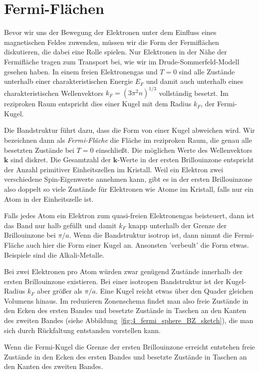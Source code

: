 \section{Fermi-Flächen}

Bevor wir uns der Bewegung der Elektronen unter dem Einfluss eines magnetischen Feldes zuwenden, müssen wir die Form der Fermiflächen diskutieren, die dabei eine Rolle spielen. Nur Elektronen in der Nähe der Fermifläche tragen zum Transport bei, wie wir im Drude-Sommerfeld-Modell gesehen haben.  In einem freien Elektronengas und $T=0$ sind alle Zustände unterhalb einer charakteristischen Energie $E_F$ und damit auch unterhalb eines charakteristischen Wellenvektors $k_F = (3 \pi^2 n)^{1/3}$ vollständig besetzt. Im reziproken Raum entspricht dies einer Kugel mit dem Radius $k_F$, der Fermi-Kugel.

Die Bandstruktur führt dazu, dass die Form von einer Kugel abweichen wird. Wir bezeichnen dann als \emph{Fermi-Fläche} die Fläche im reziproken Raum, die genau alle besetzten Zustände bei $T=0$ einschließt. Die möglichen Werte des Wellenvektors $\mathbf{k}$ sind diskret. Die Gesamtzahl der  $\mathbf{k}$-Werte in der ersten Brillouinzone entspricht der Anzahl primitiver Einheitszellen im Kristall. Weil ein Elektron zwei verschiedene Spin-Eigenwerte annehmen kann, gibt es in der ersten Brillouinzone also doppelt so viele Zustände für Elektronen wie Atome im Kristall, falls nur ein Atom in der Einheitszelle ist.

Falls jedes Atom ein Elektron zum quasi-freien Elektronengas beisteuert, dann ist das Band nur halb gefüllt und damit $k_F$ knapp  unterhalb der Grenze der Brillouinzone bei $\pi / a$. Wenn die Bandstruktur isotrop ist, dann nimmt die Fermi-Fläche auch hier die Form einer Kugel an. Ansonsten 'verbeult' die Form etwas. Beispiele sind die Alkali-Metalle.

Bei zwei Elektronen pro Atom würden zwar genügend Zustände innerhalb der ersten Brillouinzone existieren. Bei einer isotropen Bandstruktur ist der Kugel-Radius $k_F$ aber größer als $\pi /a$. Eine Kugel reicht etwas über den Quader gleichen Volumens hinaus. Im reduzieren Zonenschema findet man also freie Zustände in den Ecken des ersten Bandes und besetzte Zustände in Taschen an den Kanten des zweiten Bandes (siehe Abbildung~\ref{fig:4_fermi_sphere_BZ_sketch}), die man sich durch Rückfaltung entstanden vorstellen kann.

\begin{marginfigure}
   \caption{Wenn die Fermi-Kugel die Grenze der ersten Brillouinzone erreicht entstehen freie Zustände in den Ecken des ersten Bandes und besetzte Zustände in Taschen an den Kanten des zweiten Bandes. \label{fig:4_fermi_sphere_BZ_sketch}}
\end{marginfigure}


